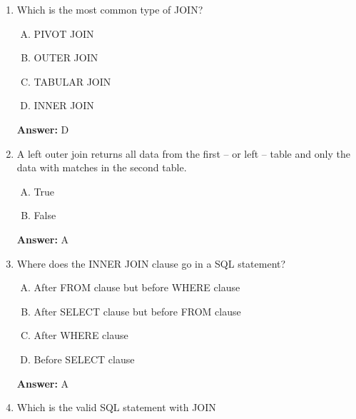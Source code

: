 \documentclass[12pt]{article}
\begin{document}
\begin{enumerate}[1.]
    \item

    Which is the most common type of JOIN?

    \bigskip

    \begin{enumerate}[A.]
        \item PIVOT JOIN
        \item OUTER JOIN
        \item TABULAR JOIN
        \item INNER JOIN
    \end{enumerate}

    \bigskip

    \textbf{Answer:} D

    \item

    A left outer join returns all data from the first -- or left -- table and
    only the data with matches in the second table.

    \bigskip

    \begin{enumerate}[A.]
        \item True
        \item False
    \end{enumerate}

    \bigskip

    \textbf{Answer:} A

    \item

    Where does the INNER JOIN clause go in a SQL statement?

    \bigskip

    \begin{enumerate}[A.]
        \item After FROM clause but before WHERE clause
        \item After SELECT clause but before FROM clause
        \item After WHERE clause
        \item Before SELECT clause
    \end{enumerate}

    \bigskip

    \textbf{Answer:} A


    \item

    Which is the valid SQL statement with JOIN

    \bigskip


\end{enumerate}
\end{document}
